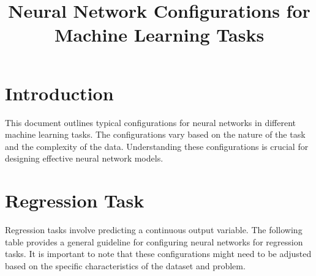 \documentclass{article}
\title{Neural Network Configurations for Machine Learning Tasks}
\author{}
\date{}
\begin{document}
\maketitle

\section*{Introduction}
This document outlines typical configurations for neural networks in different machine learning tasks. The configurations vary based on the nature of the task and the complexity of the data. Understanding these configurations is crucial for designing effective neural network models.

\section*{Regression Task}
Regression tasks involve predicting a continuous output variable. The following table provides a general guideline for configuring neural networks for regression tasks. It is important to note that these configurations might need to be adjusted based on the specific characteristics of the dataset and problem.
\end{document}
